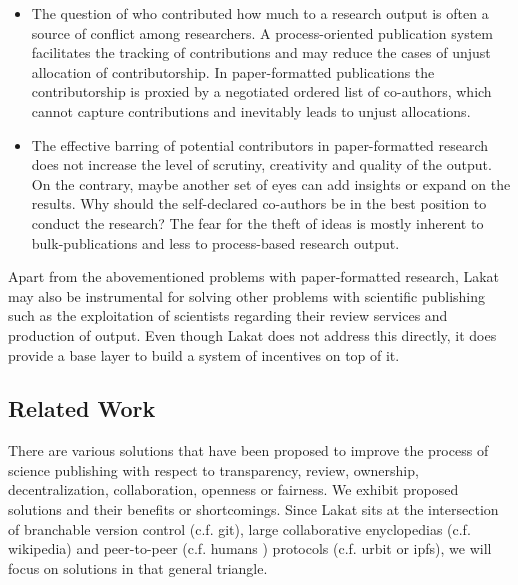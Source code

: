\begin{itemize}
\item 
The question of who contributed how much to a research output is often a source of conflict among researchers. A process-oriented publication system facilitates the tracking of contributions and may reduce the cases of unjust allocation of contributorship. In paper-formatted publications the contributorship is proxied by a negotiated ordered list of co-authors, which cannot capture contributions and inevitably leads to unjust allocations. 

\item The effective barring of potential contributors in paper-formatted research does not increase the level of scrutiny, creativity and quality of the output. On the contrary, maybe another set of eyes can add insights or expand on the results. Why should the self-declared co-authors be in the best position to conduct the research? The fear for the theft of ideas is mostly inherent to bulk-publications and less to process-based research output. 
\end{itemize}

Apart from the abovementioned problems with paper-formatted research, Lakat may also be instrumental for solving other problems with scientific publishing such as the exploitation of scientists regarding their review services and production of output. Even though Lakat does not address this directly, it does provide a base layer to build a system of incentives on top of it. 

\subsection{Related Work}

There are various solutions that have been proposed to improve the process of science publishing with respect to transparency, review, ownership, decentralization, collaboration, openness or fairness. We exhibit proposed solutions and their benefits or shortcomings. Since Lakat sits at the intersection of branchable version control (c.f. git\cite{}), large collaborative enyclopedias (c.f. wikipedia\cite{}) and peer-to-peer (c.f. humans \cite{}) protocols (c.f. urbit \cite{} or ipfs\cite{}), we will focus on solutions in that general triangle.


